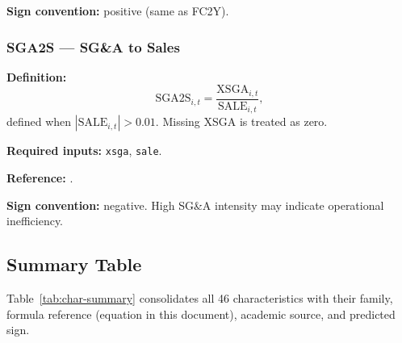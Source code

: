 \textbf{Sign convention:} positive (same as FC2Y).

\subsubsection{SGA2S --- SG\&A to Sales}

\textbf{Definition:}
\begin{equation}
\mathrm{SGA2S}_{i,t} = \frac{\mathrm{XSGA}_{i,t}}{\mathrm{SALE}_{i,t}},
\label{eq:sga2s}
\end{equation}
defined when $|\mathrm{SALE}_{i,t}| > 0.01$. Missing XSGA is treated
as zero.

\textbf{Required inputs:} \texttt{xsga}, \texttt{sale}.

\textbf{Reference:} \cite{ChenZhang2010}.

\textbf{Sign convention:} negative. High SG\&A intensity may indicate
operational inefficiency.

\subsection{Summary Table}
\label{subsec:stage0-chars-summary}

Table~\ref{tab:char-summary} consolidates all 46 characteristics with
their family, formula reference (equation in this document), academic
source, and predicted sign.

